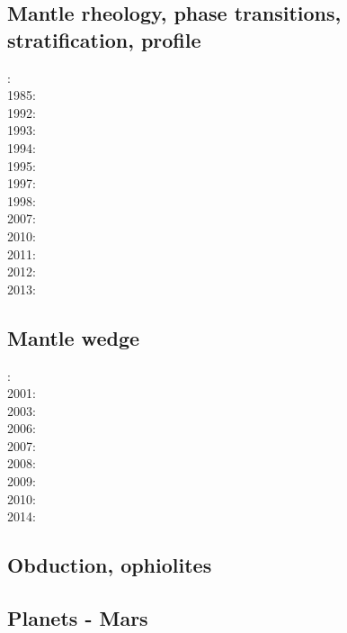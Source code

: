 \subsection*{Mantle rheology, phase transitions, stratification, profile}

: \cite{yusb82}\cite{chri82}\\
1985: \cite{chyu85}\\
1992: \cite{zhyh92}\\
1993: \cite{tasg93}\\
1994: \cite{vayv94}\\
1995: \cite{zhyu95}\\
1997: \cite{mifo97}\\
1998: \cite{cava98}\\
2007: \cite{pazw07}\\
2010: \cite{kayy10}\\
2011: \cite{java11}\cite{faff11}\\
2012: \cite{tack12}\\
2013: \cite{fakc13}


\subsection*{Mantle wedge}

: \cite{tosl78}\\
2001: \cite{bigu01}\\
2003: \cite{vank03}\\
2006: \cite{gogc06}\cite{gecy06}\\
2007: \cite{gogc07}\\
2008: \cite{knva08}\\
2009: \cite{leki09}\\
2010: \cite{roms10}\\
2014: \cite{ledg14}

\subsection*{Obduction, ophiolites}

\noindent
\cite{hack90}
\cite{hack91}
\cite{agzf14}

\subsection*{Planets - Mars}

